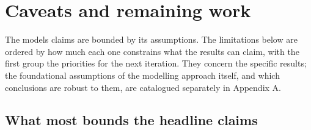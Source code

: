 \documentclass[12pt]{article}
\begin{document}
\hypertarget{caveats}{}
\hypertarget{caveats-and-remaining-work}{%
\section{Caveats and remaining work}\label{caveats-and-remaining-work}}

The model\textquotesingle s claims are bounded by its assumptions. The
limitations below are ordered by how much each one constrains what the
results can claim, with the first group the priorities for the next
iteration. They concern the specific results; the foundational
assumptions of the modelling approach itself, and which conclusions are
robust to them, are catalogued separately in Appendix A.

\hypertarget{what-most-bounds-the-headline-claims}{%
\subsection{What most bounds the headline
claims}\label{what-most-bounds-the-headline-claims}}
\end{document}
